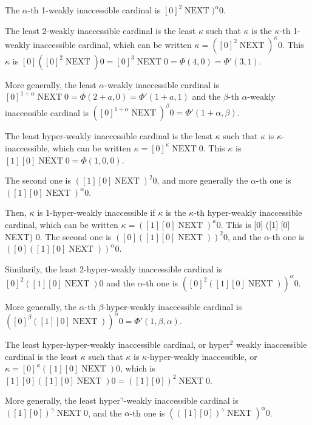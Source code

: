 \documentclass[10pt]{article}
\begin{document}
The \(\alpha\)-th 1-weakly inaccessible cardinal is \( [0]^2 \operatorname{NEXT})^\alpha 0 \).

The least 2-weakly inaccessible cardinal is the least \( \kappa \) such that \( \kappa \) is the \(\kappa\)-th 1-weakly inaccessible cardinal, which can be written \( \kappa = ([0]^2 \operatorname{NEXT})^\kappa 0 \). This \( \kappa \) is \( [0] ([0]^2 \operatorname{NEXT}) 0 = [0]^3 \operatorname{NEXT} 0 = \Phi(4,0) = \Phi'(3,1) \).

More generally, the least \(\alpha\)-weakly inaccessible cardinal is \( [0]^{1+\alpha} \operatorname{NEXT} 0 = \Phi(2+a,0) = \Phi'(1+a,1) \) and the \(\beta\)-th \(\alpha\)-weakly inaccessible cardinal is \( ([0]^{1+\alpha} \operatorname{NEXT})^\beta 0 = \Phi'(1+\alpha,\beta) \).

The least hyper-weakly inaccessible cardinal is the least \( \kappa \) such that \( \kappa \) is \(\kappa\)-inaccessible, which can be written \( \kappa = [0]^\kappa \operatorname{NEXT} 0 \). This \( \kappa \) is \( [1] [0] \operatorname{NEXT} 0 = \Phi(1,0,0) \).

The second one is \( ([1] [0] \operatorname{NEXT})^2 0 \), and more generally the \(\alpha\)-th one is \( ([1] [0] \operatorname{NEXT})^\alpha 0 \).

Then, \( \kappa \) is 1-hyper-weakly inaccessible if \( \kappa \) is the \(\kappa\)-th hyper-weakly inaccessible cardinal, which can be written \( \kappa = ([1] [0] \operatorname{NEXT})^\kappa 0 \). This is [0] ([1] [0] NEXT) 0. The second one is \( ([0] ([1] [0] \operatorname{NEXT}))^2 0 \), and the \(\alpha\)-th one is \( ([0] ([1] [0] \operatorname{NEXT}))^\alpha 0 \).

Similarily, the least 2-hyper-weakly inaccessible cardinal is \( [0]^2 ([1] [0] \operatorname{NEXT}) 0 \) and the \(\alpha\)-th one is \( ([0]^2 ([1] [0] \operatorname{NEXT}))^\alpha 0 \).

More generally, the \(\alpha\)-th \(\beta\)-hyper-weakly inaccessible cardinal is \( ([0]^\beta ([1] [0] \operatorname{NEXT}))^\alpha 0 = \Phi'(1,\beta,\alpha) \).

The least hyper-hyper-weakly inaccessible cardinal, or hyper\(^2\) weakly inaccessible cardinal is the least \( \kappa \) such that \( \kappa \) is \(\kappa\)-hyper-weakly inaccessible, or \( \kappa = [0]^\kappa ([1]  [0] \operatorname{NEXT}) 0 \), which is  \( [1] [0] ([1] [0] \operatorname{NEXT}) 0  = ([1] [0])^2 \operatorname{NEXT} 0 \).

More generally, the least hyper\(^\gamma\)-weakly inaccessible cardinal is \( ([1] [0])^\gamma \operatorname{NEXT} 0 \), and the \(\alpha\)-th one is \( (([1] [0])^\gamma \operatorname{NEXT})^\alpha 0 \).
\end{document}

